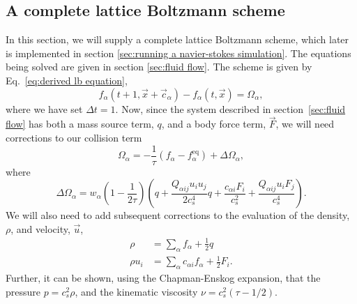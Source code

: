 \documentclass[11pt,a4paper]{report}
\begin{document}
\subsection{A complete lattice Boltzmann scheme}
In this section, we will supply a complete lattice Boltzmann scheme, which later is implemented in section \ref{sec:running a navier-stokes simulation}. The equations being solved are given in section \ref{sec:fluid flow}. The scheme is given by Eq.~\eqref{eq:derived lb equation},
\begin{equation}
f_\alpha(t + 1, \vec{x} + \vec{c}_\alpha) - f_\alpha(t, \vec{x}) = \Omega_\alpha,
\end{equation} 
where we have set $\Delta t = 1$. Now, since the system described in section~\ref{sec:fluid flow} has both a mass source term, $q$, and a body force term, $\vec{F}$, we will need corrections to our collision term~\cite{aursjo_inclusion_2018}
\begin{equation}
\Omega_\alpha = -\frac{1}{\tau}\left(f_\alpha - f^\mathrm{eq}_\alpha\right) + \Delta\Omega_\alpha,
\end{equation}
where
\begin{equation}
\Delta\Omega_\alpha = w_\alpha\left(1-\frac{1}{2\tau}\right)\left(q + \frac{Q_{\alpha ij}u_iu_j}{2c_s^4}q + \frac{c_{\alpha i}F_i}{c_s^2} + \frac{Q_{\alpha ij}u_iF_j}{c_s^4}\right).
\end{equation}
We will also need to add subsequent corrections to the evaluation of the density, $\rho$, and velocity, $\vec{u}$,
\begin{align*}
\rho &= \sum_\alpha f_\alpha + \frac{1}{2}q \\
\rho u_i &= \sum_\alpha c_{\alpha i}f_\alpha + \frac{1}{2}F_i.
\end{align*}
Further, it can be shown, using the Chapman-Enskog expansion, that the pressure $p = c_s^2\rho$, and the kinematic viscosity $\nu = c_s^2(\tau - 1/2)$.
\end{document}
